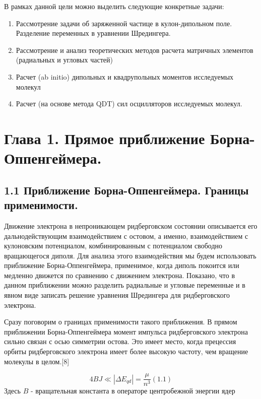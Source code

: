 \documentclass[a4paper]{article}
\newcommand\liststyleWWNumiii{%
\renewcommand\theenumi{\arabic{enumi}}
\renewcommand\theenumii{\alph{enumii}}
\renewcommand\theenumiii{\roman{enumiii}}
\renewcommand\theenumiv{\arabic{enumiv}}
\renewcommand\labelenumi{\theenumi.}
\renewcommand\labelenumii{\theenumii.}
\renewcommand\labelenumiii{\theenumiii.}
\renewcommand\labelenumiv{\theenumiv.}
}
\begin{document}
В рамках данной цели можно выделить следующие конкретные задачи: 

\liststyleWWNumiii
\begin{enumerate}
\item Рассмотрение
задачи об заряженной частице в кулон-дипольном поле. Разделение переменных в уравнении Шредингера.
\item Рассмотрение и
анализ теоретических методов расчета матричных элементов (радиальных и угловых частей)
\item Расчет (\foreignlanguage{english}{ab} \foreignlanguage{english}{initio})
дипольных и квадрупольных моментов исследуемых молекул
\item Расчет (на основе
метода \foreignlanguage{english}{QDT}) сил
осцилляторов исследуемых молекул.
\end{enumerate}

\bigskip


\bigskip

\clearpage\section{Глава 1. Прямое
приближение
Борна-Оппенгеймера.}
\hypertarget{RefHeading4669463868395}{}\subsection{1.1
Приближение Борна-Оппенгеймера. Границы
применимости.}
\hypertarget{RefHeading4671463868395}{}Движение
электрона в непроникающем ридберговском состоянии описывается его дальнодействующим взаимодействием с остовом, а именно, взаимодействием с кулоновским потенциалом, комбинированным с потенциалом свободно вращающегося диполя. Для анализа этого взаимодействия мы будем использовать приближение Борна-Оппенгеймера, применимое, когда диполь покоится или медленно движется по сравнению с движением электрона. Показано, что в данном приближении можно разделить радиальные и угловые переменные и в явном виде записать решение уравнения Шредингера для ридберговского электрона.

Сразу поговорим о границах применимости такого приближения. В прямом приближении Борна-Оппенгеймера момент импульса ридберговского электрона сильно связан с осью симметрии остова. Это имеет место, когда прецессия орбиты ридберговского электрона имеет более высокую частоту, чем вращение молекулы в целом.[8]

\begin{equation*}
4\mathit{BJ}{\ll}\left|{\Delta}E_{\mathit{qd}}\right|=\frac{\mu }{n^3}(1.1)
\end{equation*}
Здесь  $B$ -
вращательная константа в операторе центробежной энергии ядер
\end{document}
